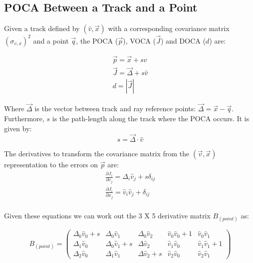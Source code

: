 \documentclass[fleqn,twoside,draft]{article}
\begin{document}
\subsection{POCA Between a Track and a Point}

Given a track defined by $(\hat{v},\vec{x})$ with a corresponding covariance matrix $(\sigma_{v,x})^2$ and a point $\vec{q}$, the POCA ($\vec{p}$), VOCA ($\vec{J}$) and DOCA ($d$) are:

\begin{subequations}
\begin{gather}
  \vec{p} = \vec{x} + s \hat{v} \\
  \vec{J} = \vec{\Delta} + s \hat{v} \\
  d = |\vec{J}| 
\end{gather}
\end{subequations}

Where $\vec{\Delta}$ is the vector between track and ray reference points: $\vec{\Delta} = \vec{x} - \vec{q}$.  Furthermore, $s$ is the path-length along the track where the POCA occurs.  It is given by:
\begin{equation}  
  s = \vec{\Delta} \cdot \hat{v}
\end{equation}

The derivatives to transform the covariance matrix from the $(\vec{v},\vec{x})$ representation to the errors on $\vec{p}$ are:
\begin{subequations}
\begin{gather}
  \frac{\partial J_{i}}{\partial v_{j}} = \Delta_i \hat{v}_{j} + s \delta_{ij} \\
  \frac{\partial J_{i}}{\partial x_{j}} = \hat{v}_{i} \hat{v}_{j} + \delta_{ij} \\
\end{gather}
\end{subequations}

Given these equations we can work out the 3 X 5 derivative matrix $B_{(point)}$ as:

\begin{equation}
  B_{(point)} = 
\begin{pmatrix}
  \Delta_0 \hat{v}_{0} + s & 
  \Delta_0 \hat{v}_{1} & 
  \Delta_0 \hat{v}_{2} & 
  \hat{v}_{0} \hat{v}_{0} + 1 & 
  \hat{v}_{0} \hat{v}_{1} \\
  \Delta_1 \hat{v}_{0} & 
  \Delta_0 \hat{v}_{1} + s & 
  \Delta \hat{v}_{2} & 
  \hat{v}_{1} \hat{v}_{0} & 
  \hat{v}_{1} \hat{v}_{1} + 1 \\
  \Delta_2 \hat{v}_{0} & 
  \Delta_1 \hat{v}_{1} & 
  \Delta \hat{v}_{2} + s &
  \hat{v}_{2} \hat{v}_{0} &
  \hat{v}_{2} \hat{v}_{1}
\end{pmatrix}
\end{equation}
\end{document}
